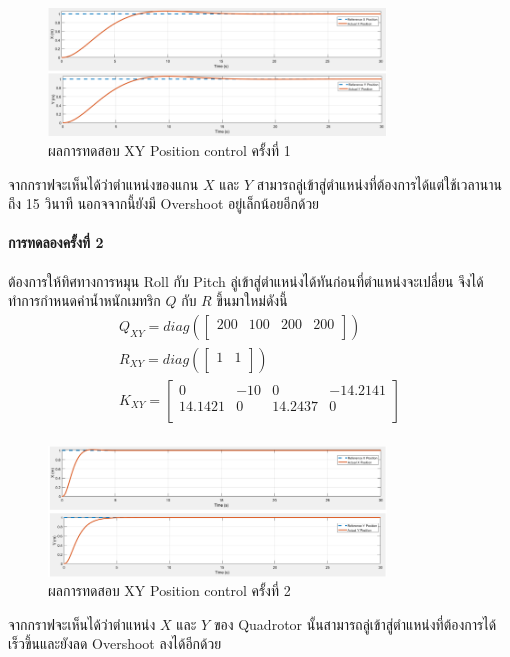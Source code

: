 \begin{figure}[!ht]
	\centering
	\includegraphics[width=0.8\textwidth]{images/simulink/XY_control1.png}
	\caption{ผลการทดสอบ XY Position control ครั้งที่ 1}
\end{figure}

จากกราฟจะเห็นได้ว่าตำแหน่งของแกน $X$ และ $Y$ สามารถลู่เข้าสู่ตำแหน่งที่ต้องการได้แต่ใช้เวลานานถึง 15 วินาที นอกจจากนี้ยังมี Overshoot อยู่เล็กน้อยอีกด้วย
\paragraph*{การทดลองครั้งที่ 2}
ต้องการให้ทิศทางการหมุน Roll กับ Pitch ลู่เข้าสู่ตำแหน่งได้ทันก่อนที่ตำแหน่งจะเปลี่ยน จึงได้ทำการกำหนดค่าน้ำหนักเมทริก $Q$ กับ $R$ ขึ้นมาใหม่ดังนี้
\begin{equation}
    \begin{array}{c}
    {Q_{XY}=diag(\begin{bmatrix}
        200 & 100 & 200 & 200 \\
    \end{bmatrix})}\\[10pt]
    {R_{XY} = diag(\begin{bmatrix}
        1 & 1 \\
    \end{bmatrix})}\\[10pt]
    {K_{XY} = \begin{bmatrix}
        0 & -10 & 0 & -14.2141 \\
        14.1421 & 0 & 14.2437 & 0 \\
    \end{bmatrix}} \\[10pt]
    \end{array}
\end{equation}

\begin{figure}[!ht]
	\centering
	\includegraphics[width=0.8\textwidth]{images/simulink/XY_control2.png}
	\caption{ผลการทดสอบ XY Position control ครั้งที่ 2}
\end{figure}

จากกราฟจะเห็นได้ว่าตำแหน่ง $X$ และ $Y$ ของ Quadrotor นั้นสามารถลู่เข้าสู่ตำแหน่งที่ต้องการได้เร็วขึ้นและยังลด Overshoot ลงได้อีกด้วย